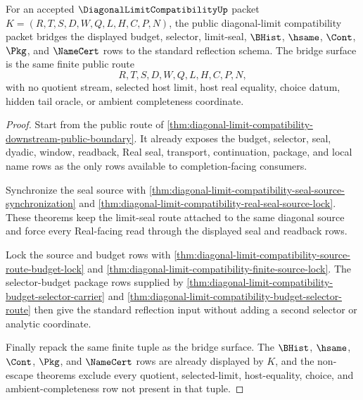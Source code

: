 \begin{theorem}
\label{thm:diagonal-limit-compatibility-standard-bridge-surface}
For an accepted $\DiagonalLimitCompatibilityUp$ packet $K=(R,T,S,D,W,Q,L,H,C,P,N)$, the public diagonal-limit compatibility packet bridges the displayed budget, selector, limit-seal, $\BHist$, $\hsame$, $\Cont$, $\Pkg$, and $\NameCert$ rows to the standard reflection schema. The bridge surface is the same finite public route
$$
R,T,S,D,W,Q,L,H,C,P,N,
$$
with no quotient stream, selected host limit, host real equality, choice datum, hidden tail oracle, or ambient completeness coordinate.
\end{theorem}
\begin{proof}
Start from the public route of \autoref{thm:diagonal-limit-compatibility-downstream-public-boundary}. It already exposes the budget, selector, seal, dyadic, window, readback, Real seal, transport, continuation, package, and local name rows as the only rows available to completion-facing consumers.

Synchronize the seal source with \autoref{thm:diagonal-limit-compatibility-seal-source-synchronization} and \autoref{thm:diagonal-limit-compatibility-real-seal-source-lock}. These theorems keep the limit-seal route attached to the same diagonal source and force every Real-facing read through the displayed seal and readback rows.

Lock the source and budget rows with \autoref{thm:diagonal-limit-compatibility-source-route-budget-lock} and \autoref{thm:diagonal-limit-compatibility-finite-source-lock}. The selector-budget package rows supplied by \autoref{thm:diagonal-limit-compatibility-budget-selector-carrier} and \autoref{thm:diagonal-limit-compatibility-budget-selector-route} then give the standard reflection input without adding a second selector or analytic coordinate.

Finally repack the same finite tuple as the bridge surface. The $\BHist$, $\hsame$, $\Cont$, $\Pkg$, and $\NameCert$ rows are already displayed by $K$, and the non-escape theorems exclude every quotient, selected-limit, host-equality, choice, and ambient-completeness row not present in that tuple.
\end{proof}

